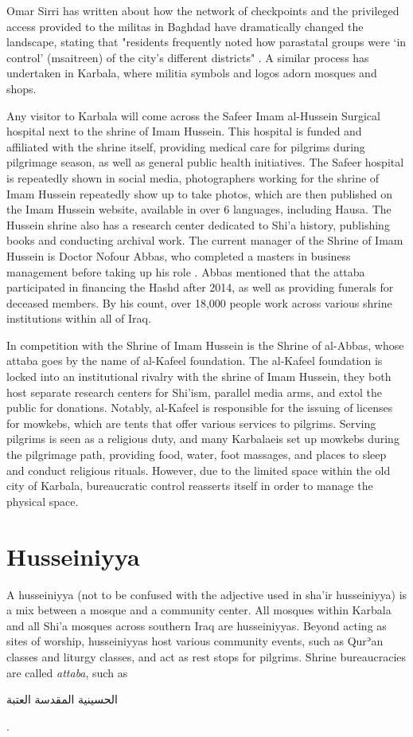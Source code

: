 Omar Sirri has written about how the network of checkpoints and the privileged access provided to the militas in Baghdad have dramatically changed the landscape, stating that "residents frequently noted how parastatal groups were ‘in control’ (msaitreen) of the city’s different districts" \cite[14]{omar_sirri_destructive_2021}. A similar process has undertaken in Karbala, where militia symbols and logos adorn mosques and shops. 

Any visitor to Karbala will come across the Safeer Imam al-Hussein Surgical hospital next to the shrine of Imam Hussein. This hospital is funded and affiliated with the shrine itself, providing medical care for pilgrims during pilgrimage season, as well as general public health initiatives. The Safeer hospital is repeatedly shown in social media, photographers working for the shrine of Imam Hussein repeatedly show up to take photos, which are then published on the Imam Hussein website, available in over 6 languages, including Hausa. The Hussein shrine also has a research center dedicated to Shi'a history, publishing books and conducting archival work. The current manager of the Shrine of Imam Hussein is Doctor Nofour Abbas, who completed a masters in business management before taking up his role \cite{nofour_abbas_interview_2021}. Abbas mentioned that the attaba participated in financing the Hashd after 2014, as well as providing funerals for deceased members. By his count, over 18,000 people work across various shrine institutions within all of Iraq. 

In competition with the Shrine of Imam Hussein is the Shrine of al-Abbas, whose attaba goes by the name of al-Kafeel foundation. The al-Kafeel foundation is locked into an institutional rivalry with the shrine of Imam Hussein, they both host separate research centers for Shi'ism, parallel media arms, and extol the public for donations. Notably, al-Kafeel is responsible for the issuing of licenses for mowkebs, which are tents that offer various services to pilgrims. Serving pilgrims is seen as a religious duty, and many Karbalaeis set up mowkebs during the pilgrimage path, providing food, water, foot massages, and places to sleep and conduct religious rituals. However, due to the limited space within the old city of Karbala, bureaucratic control reasserts itself in order to manage the physical space. 

\section{Husseiniyya}
A husseiniyya (not to be confused with the adjective used in sha'ir husseiniyya) is a mix between a mosque and a community center. All mosques within Karbala and all Shi'a mosques across southern Iraq are husseiniyyas. Beyond acting as sites of worship, husseiniyyas host various community events, such as Qurʾan classes and liturgy classes, and act as rest stops for pilgrims. Shrine bureaucracies are called \emph{attaba}, such as 
\begin{Arabic}
الحسينية المقدسة العتبة 
\end{Arabic}.

